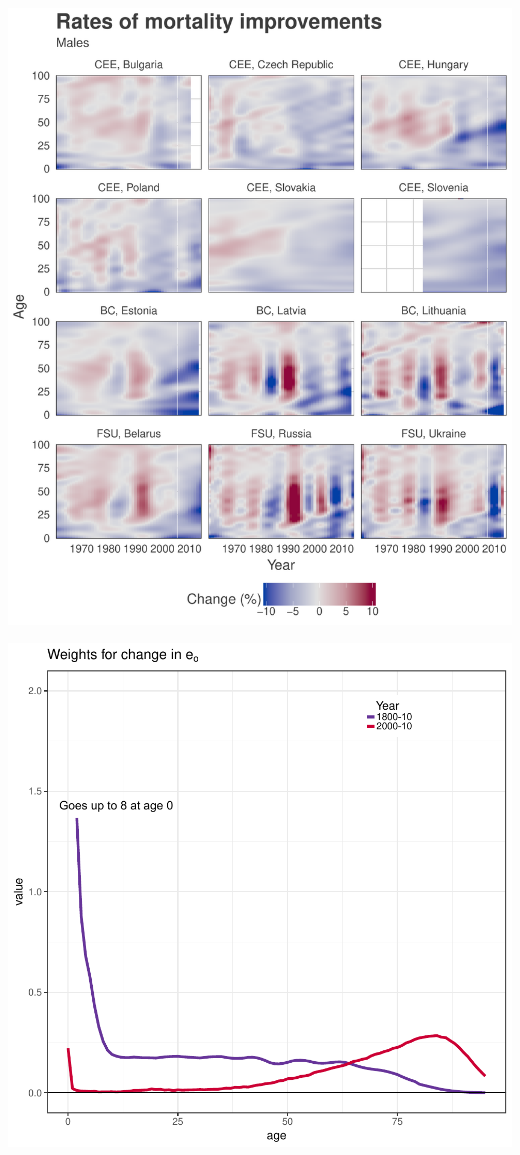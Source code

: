 \documentclass[xcolor={dvipsnames}]{beamer}
\begin{document}
\begin{frame}
\begin{center}
\includegraphics[scale=.28]{Figures/Romi_males}
\end{center}
\end{frame}


\begin{frame}
\begin{center}
\includegraphics[scale=.5]{Figures/Sweden_weighs_e0}
\end{center}
\end{frame}
\end{document}
